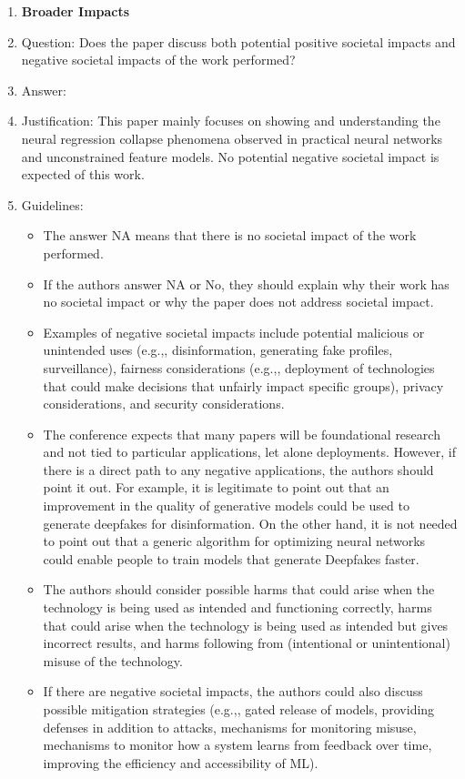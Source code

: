 \documentclass{article}
\theoremstyle{plain}
\theoremstyle{definition}
\theoremstyle{remark}
\begin{document}
\begin{enumerate}
\item {\bf Broader Impacts}
    \item[] Question: Does the paper discuss both potential positive societal impacts and negative societal impacts of the work performed?
    \item[] Answer: \answerNA{} %
    \item[] Justification: This paper mainly focuses on showing and understanding the neural regression collapse phenomena observed in practical neural networks and unconstrained feature models. No potential negative societal impact is expected of this work. 
    \item[] Guidelines:
    \begin{itemize}
        \item The answer NA means that there is no societal impact of the work performed.
        \item If the authors answer NA or No, they should explain why their work has no societal impact or why the paper does not address societal impact.
        \item Examples of negative societal impacts include potential malicious or unintended uses (e.g.,, disinformation, generating fake profiles, surveillance), fairness considerations (e.g.,, deployment of technologies that could make decisions that unfairly impact specific groups), privacy considerations, and security considerations.
        \item The conference expects that many papers will be foundational research and not tied to particular applications, let alone deployments. However, if there is a direct path to any negative applications, the authors should point it out. For example, it is legitimate to point out that an improvement in the quality of generative models could be used to generate deepfakes for disinformation. On the other hand, it is not needed to point out that a generic algorithm for optimizing neural networks could enable people to train models that generate Deepfakes faster.
        \item The authors should consider possible harms that could arise when the technology is being used as intended and functioning correctly, harms that could arise when the technology is being used as intended but gives incorrect results, and harms following from (intentional or unintentional) misuse of the technology.
        \item If there are negative societal impacts, the authors could also discuss possible mitigation strategies (e.g.,, gated release of models, providing defenses in addition to attacks, mechanisms for monitoring misuse, mechanisms to monitor how a system learns from feedback over time, improving the efficiency and accessibility of ML).
    \end{itemize}
    

\end{enumerate}
\end{document}
